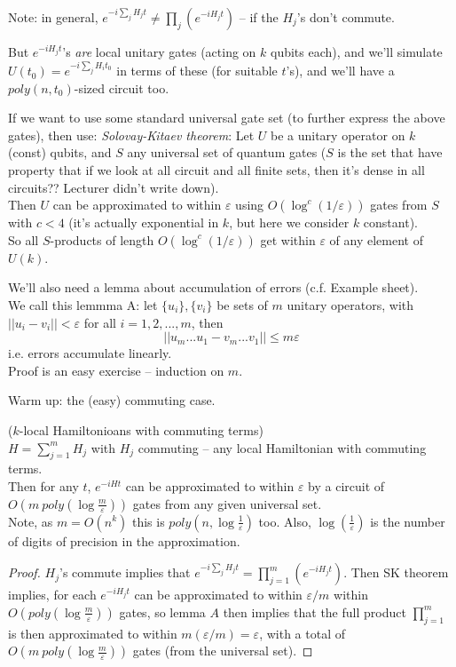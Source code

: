\documentclass[a4paper]{article}
\begin{document}
Note: in general, $e^{-i\sum_{j} H_j t} \neq \prod_j (e^{-i H_j t})$ -- if the $H_j$'s don't commute.

But $e^{-iH_j t}$'s \emph{are} local unitary gates (acting on $k$ qubits each), and we'll simulate $U(t_0) = e^{-i \sum_j H_i t_0}$ in terms of these (for suitable $t$'s), and we'll have a $poly(n,t_0)$-sized circuit too.

If we want to use some standard universal gate set (to further express the above gates), then use: \emph{Solovay-Kitaev theorem}: Let $U$ be a unitary operator on $k$ (const) qubits, and $S$ any universal set of quantum gates ($S$ is the set that have property that if we look at all circuit and all finite sets, then it's dense in all circuits?? Lecturer didn't write down).\\
Then $U$ can be approximated to within $\varepsilon$ using $O(\log^c(1/\varepsilon))$ gates from $S$ with $c < 4$ (it's actually exponential in $k$, but here we consider $k$ constant).\\
So all $S$-products of length $O(\log^c(1/\varepsilon))$ get within $\varepsilon$ of any element of $U(k)$.

We'll also need a lemma about accumulation of errors (c.f. Example sheet).\\
We call this lemmma A: let $\{u_i\}, \{v_i\}$ be sets of $m$ unitary operators, with $||u_i - v_i|| < \varepsilon$ for all $i=1,2,...,m$, then 
$$||u_m...u_1 - v_m...v_1|| \leq m\varepsilon$$
i.e. errors accumulate linearly.\\
Proof is an easy exercise -- induction on $m$.

Warm up: the (easy) commuting case.
\begin{prop} ($k$-local Hamiltonioans with commuting terms)\\
    $H=\sum_{j=1}^m H_j$ with $H_j$ commuting -- any local Hamiltonian with commuting terms.\\
    Then for any $t$, $e^{-iHt}$ can be approximated to within $\varepsilon$ by a circuit of $O(m\ poly(\log \frac{m}{\varepsilon}))$ gates from any given universal set.\\
    Note, as $m=O(n^k)$ this is $poly(n,\log\frac{1}{\varepsilon})$ too. Also, $\log(\frac{1}{\varepsilon})$ is the number of digits of precision in the approximation.
    \begin{proof}
        $H_j$'s commute implies that $e^{-i \sum_j H_j t} = \prod_{j=1}^m (e^{-i H_j t})$. Then SK theorem implies, for each $e^{-iH_j t}$ can be approximated to within $\varepsilon/m$ within $O(poly(\log\frac{m}{\varepsilon}))$ gates, so lemma $A$ then implies that the full product $\prod_{j=1}^m$ is then approximated to within $m(\varepsilon/m) = \varepsilon$, with a total of $O(m\ poly(\log \frac{m}{\varepsilon}))$ gates (from the universal set).
    \end{proof}
\end{prop}
\end{document}
